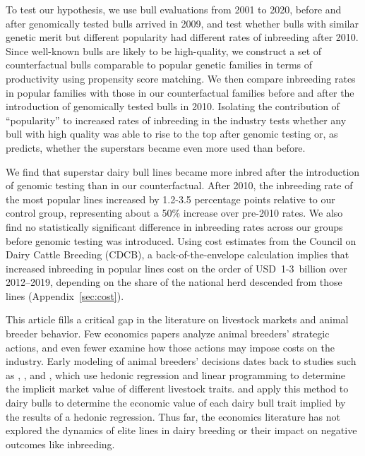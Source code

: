\documentclass[12pt,letterpaper]{article}
\begin{document}
To test our hypothesis, we use bull evaluations from 2001 to 2020, before and after genomically tested bulls arrived in 2009, and test whether bulls with similar genetic merit but different popularity had different rates of inbreeding after 2010. Since well-known bulls are likely to be high-quality, we construct a set of counterfactual bulls comparable to popular genetic families in terms of productivity using propensity score matching. We then compare inbreeding rates in popular families with those in our counterfactual families before and after the introduction of genomically tested bulls in 2010. Isolating the contribution of ``popularity'' to increased rates of inbreeding in the industry tests whether any bull with high quality was able to rise to the top after genomic testing or, as \citet{adler1985stardom} predicts, whether the superstars became even more used than before.

We find that superstar dairy bull lines became more inbred after the introduction of genomic testing than in our counterfactual. 
After 2010, the inbreeding rate of the most popular lines increased by 1.2-3.5 percentage points relative to our control group, representing about a 50\% increase over pre-2010 rates. We also find no statistically significant difference in inbreeding rates across our groups before genomic testing was introduced. Using cost estimates from the Council on Dairy Cattle Breeding (CDCB), a back-of-the-envelope calculation implies that increased inbreeding in popular lines cost on the order of USD~1-3~billion over 2012--2019, depending on the share of the national herd descended from those lines (Appendix~\ref{sec:cost}).

This article fills a critical gap in the literature on livestock markets and animal breeder behavior. Few economics papers analyze animal breeders' strategic actions, and even fewer examine how those actions may impose costs on the industry.  Early modeling of animal breeders' decisions dates back to studies such as \citet{ladd1978}, \citet{Kerr1984}, and \citet{Melton1994}, which use hedonic regression and linear programming to determine the implicit market value of different livestock traits. \citet{Richards1996} and \citet{Schroeder1992} apply this method to dairy bulls to determine the economic value of each dairy bull trait implied by the results of a hedonic regression. Thus far, the economics literature has not explored the dynamics of elite lines in dairy breeding or their impact on negative outcomes like inbreeding.
\end{document}

